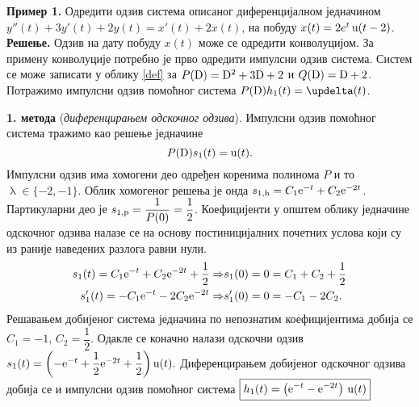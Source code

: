 \vspace*{10mm}



\noindent\textbf{Пример 1.} Одредити одзив система 
описаног диференцијалном једначином 
$y''(t) + 3 y'(t) + 2y(t) = x'(t) + 2x(t) $, 
на побуду $x(t) = 2e^t\,{\rm u}(t-2)$. \\[1mm]
%

\noindent\textbf{Решење.} Одзив на дату побуду $x(t)$
може се одредити конволуцијом. За примену конволуције
потребно је прво одредити импулсни одзив система. 
Систем се може записати у облику \eqref{def} за
$P({\rm D}) = {\rm D}^2 + 3 {\rm D} + 2$ и 
$Q({\rm D}) = {\rm D} + 2$. Потражимо импулсни одзив
помоћног система $P({\rm D}) h_1(t) = \updelta(t)$.

\vspace*{2mm}
\noindent
\textbf{1. метода} (\textit{диференцирањем одскочног 
одзива}). Импулсни одзив помоћног система 
тражимо као решење једначине 
\begin{equation}
P({\rm D}) s_1(t) = {\rm u}(t).
\label{eq:step}
\end{equation} Импулсни одзив
има хомогени део одређен коренима полинома $P$ и то 
$\uplambda \in \{-2, -1\}$. Облик хомогеног решења 
је онда $s_{\rm 1,h} = C_1 {\rm e}^{-t} + C_2
{\rm e}^{-2t}$. Партикуларни део је 
$s_{\rm 1,p} = \dfrac{1}{P(0)} = \dfrac{1}{2}$. 
Коефицијенти у општем облику једначине одскочног одзива
налазе се на основу постиницијалних почетних услова 
који су из раније наведених разлога равни нули. 
\begin{eqnarray}
s_1(t) = C_1 {\rm e}^{-t} + C_2
{\rm e}^{-2t} + \dfrac{1}{2} \Rightarrow &
s_1(0) = 0 = C_1 + C_2 + \dfrac{1}{2} \\
s_1'(t) = -C_1 {\rm e}^{-t} - 2 C_2
{\rm e}^{-2t}  \Rightarrow &
s_1'(0) = 0 = -C_1 -2 C_2 .
\end{eqnarray}
Решавањем добијеног система једначина по 
непознатим коефицијентима добија се 
$C_1 = -1$, $C_2 = \dfrac{1}{2}$. Одакле се 
коначно налази одскочни одзив 
$
s_1(t) = 
\left(	
-{\rm e}^{-t} + \dfrac{1}{2}{\rm e}^{-2t} + 
\dfrac{1}{2} \right) {\rm u}(t).
$ 
Диференцирањем добијеног одскочног одзива 
добија се и импулсни одзив помоћног система
$
\boxed{
h_1(t) =
\left(
{\rm e}^{-t}  - {\rm e}^{-2t} 
\right) \, {\rm u}(t)
}
$

